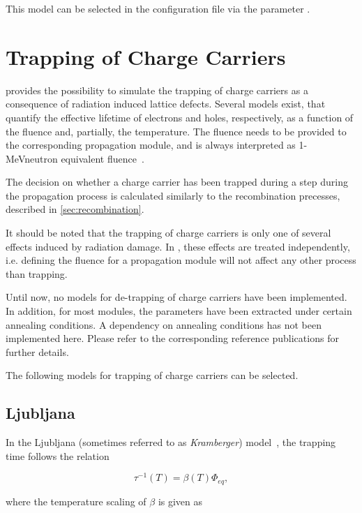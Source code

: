 This model can be selected in the configuration file via the parameter .


\section{Trapping of Charge Carriers}
\label{sec:trapping}

\apsq provides the possibility to simulate the trapping of charge carriers as a consequence of radiation induced lattice defects.
Several models exist, that quantify the effective lifetime of electrons and holes, respectively, as a function of the fluence and, partially, the temperature.
The fluence needs to be provided to the corresponding propagation module, and is always interpreted as 1-MeVneutron equivalent fluence~\cite{niel}.

The decision on whether a charge carrier has been trapped during a step during the propagation process is calculated similarly to the recombination precesses, described in \ref{sec:recombination}.

It should be noted that the trapping of charge carriers is only one of several effects induced by radiation damage.
In \apsq, these effects are treated independently, i.e. defining the fluence for a propagation module will not affect any other process than trapping.

Until now, no models for de-trapping of charge carriers have been implemented.
In addition, for most modules, the parameters have been extracted under certain annealing conditions.
A dependency on annealing conditions has not been implemented here.
Please refer to the corresponding reference publications for further details.

The following models for trapping of charge carriers can be selected.

\subsection{Ljubljana}
\label{sec:trap:ljubljana}

In the Ljubljana (sometimes referred to as \textit{Kramberger}) model~\cite{kramberger}, the trapping time follows the relation

\begin{equation*}
    \tau^{-1}(T) = \beta(T)\Phi_{eq} ,
\end{equation*}

where the temperature scaling of $\beta$ is given as

